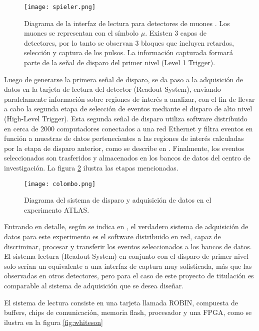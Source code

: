 	
	\begin{figure}[h]
		\centering
		\texttt{[image: spieler.png]}
		\caption{Diagrama de la interfaz de lectura para detectores de muones \cite{Spieler2012ElectronicsAcquisition}. Los muones se representan con el símbolo $\mu$. Existen 3 capas de detectores, por lo tanto se observan 3 bloques que incluyen retardos, selección y captura de los pulsos. La información capturada formará parte de la señal de disparo del primer nivel (Level 1 Trigger).}
		\label{fig:spieler}
	\end{figure}
	
	\par Luego de generarse la primera señal de disparo, se da paso a la adquisición de datos en la tarjeta de lectura del detector (Readout System), enviando paralelamente información sobre regiones de interés a analizar, con el fin de llevar a cabo la segunda etapa de selección de eventos mediante el disparo de alto nivel (High-Level Trigger). Esta segunda señal de disparo utiliza software distribuido en cerca de 2000 computadores conectados a una red Ethernet y filtra eventos en función a muestras de datos pertenecientes a las regiones de interés calculadas por la etapa de disparo anterior, como se describe en \cite{Colombo2015Data-flowCase}. Finalmente, los eventos seleccionados son trasferidos y  almacenados en los bancos de datos del centro de investigación. La figura \ref{fig:colombo} ilustra las etapas mencionadas.
	
	\begin{figure}[h]
		\centering
		\texttt{[image: colombo.png]}
		\caption{Diagrama del sistema de disparo y adquisición de datos en el experimento ATLAS. \cite{Colombo2015Data-flowCase}}
		\label{fig:colombo}
	\end{figure}
	
	\par Entrando en detalle, según se indica en \cite{Whiteson2016TheSystem}, el verdadero sistema de adquisición de datos para este experimento es el software distribuido en red, capaz de discriminar, procesar y transferir los eventos seleccionados a los bancos de datos. El sistema lectura (Readout System) en conjunto con el disparo de primer nivel solo serían un equivalente a una interfaz de captura muy sofisticada, más que las observadas en otros detectores, pero para el caso de este proyecto de titulación es comparable al sistema de adquisición que se desea diseñar.
	
	\par El sistema de lectura consiste en una tarjeta llamada ROBIN, compuesta de buffers, chips de comunicación, memoria flash, procesador y una FPGA, como se ilustra en la figura \ref{fig:whiteson}
	
